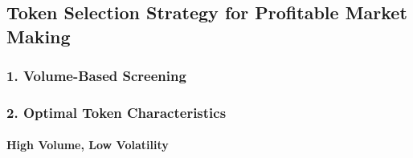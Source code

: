 \hypertarget{token-selection-strategy-for-profitable-market-making}{%
\subsection{Token Selection Strategy for Profitable Market
Making}\label{token-selection-strategy-for-profitable-market-making}}

\hypertarget{volume-based-screening}{%
\subsubsection{\texorpdfstring{1. \textbf{Volume-Based
Screening}}{1. Volume-Based Screening}}\label{volume-based-screening}}

\begin{Shaded}
\begin{Highlighting}[]
\OperatorTok{=}\NormalTok{ \{}
        \NormalTok{: }\NormalTok{,    }
        \NormalTok{: }\NormalTok{,            }
        \NormalTok{: }\NormalTok{,          }
        \NormalTok{: }\NormalTok{,     }
        \NormalTok{: }\NormalTok{,           }
\NormalTok{    \}}
\end{Highlighting}
\end{Shaded}

\hypertarget{optimal-token-characteristics}{%
\subsubsection{\texorpdfstring{2. \textbf{Optimal Token
Characteristics}}{2. Optimal Token Characteristics}}\label{optimal-token-characteristics}}

\hypertarget{high-volume-low-volatility}{%
\paragraph{\texorpdfstring{\textbf{High Volume, Low
Volatility}}{High Volume, Low Volatility}}\label{high-volume-low-volatility}}

